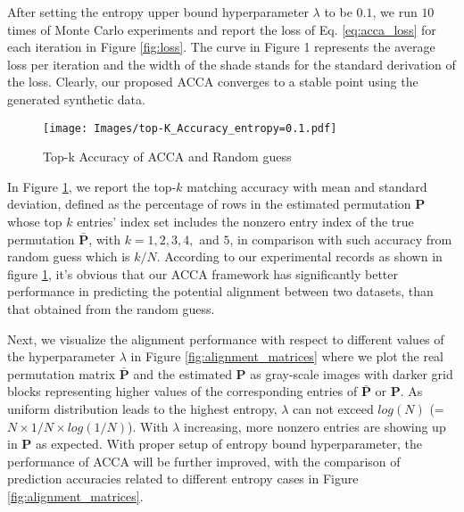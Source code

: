 After setting the entropy upper bound hyperparameter $\lambda$ to be $0.1$, we run $10$ times of Monte Carlo experiments and report the loss of Eq. \eqref{eq:acca_loss} for each iteration in Figure \ref{fig:loss}. The curve in Figure 1 represents the average loss per iteration and the width of the shade stands for the standard derivation of the loss. Clearly, our proposed ACCA converges to a stable point using the generated synthetic data.

\begin{figure}[!htp]
  \texttt{[image: Images/top-K\_Accuracy\_entropy=0.1.pdf]}
  \caption{Top-k Accuracy of ACCA and Random guess} 
  \label{fig:topk}
\end{figure}

In Figure \ref{fig:topk}, we report the top-$k$ matching accuracy with mean and standard deviation, defined as the percentage of rows in the estimated permutation $\mathbf{P}$ whose top $k$ entries' index set includes the nonzero entry index of the true permutation  $\bar{\mathbf{P}}$, with $k=1,2,3,4,$ and $5$, in comparison with such accuracy from random guess which is $k/N$.  According to our experimental records as shown in  figure \ref{fig:topk}, it's obvious that our ACCA framework has significantly better performance in predicting the potential alignment between two datasets, than that obtained from the random guess. 

\begin{figure*}[!htp]
    \caption{Estimated alignment matrix for different Entropy bounds.}
    \label{fig:alignment_matrices}
\end{figure*}

Next, we visualize the alignment performance with respect to different values of the hyperparameter $\lambda$ in Figure \ref{fig:alignment_matrices} where we plot the real permutation matrix $\bar{\mathbf{P}}$ and the estimated $\mathbf{P}$ as gray-scale images with darker grid blocks representing higher values of the corresponding entries of $\bar{\mathbf{P}}$ or $\mathbf{P}$. As uniform distribution leads to the highest entropy, $\lambda$ can not exceed $log(N)$ (=$N \times 1/N \times log(1/N)$). With  $\lambda$ increasing, more nonzero entries are showing up in $\mathbf{P}$ as expected. With proper setup of entropy bound hyperparameter, the performance of ACCA will be further improved, with the comparison of prediction accuracies related to different entropy cases in Figure \ref{fig:alignment_matrices}. 


